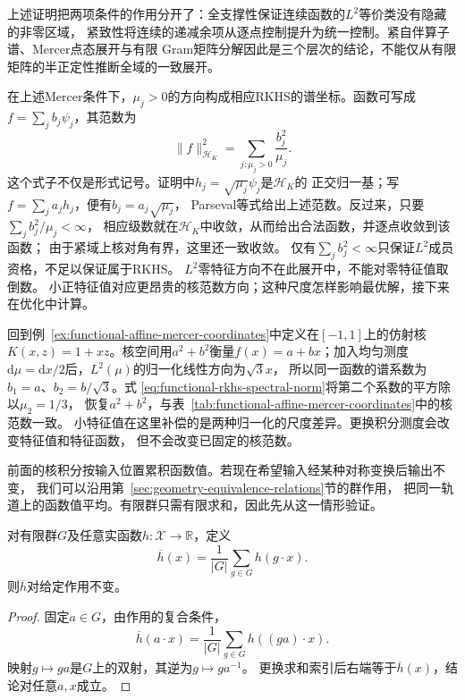 上述证明把两项条件的作用分开了：全支撑性保证连续函数的$L^2$等价类没有隐藏的非零区域，
紧致性将连续的递减余项从逐点控制提升为统一控制。紧自伴算子谱、Mercer点态展开与有限
Gram矩阵分解因此是三个层次的结论，不能仅从有限矩阵的半正定性推断全域的一致展开。

在上述Mercer条件下，$\mu_j>0$的方向构成相应RKHS的谱坐标。函数可写成
$f=\sum_jb_j\psi_j$，其范数为
\begin{equation}
  \lVert f\rVert_{\mathcal{H}_K}^2
  =
  \sum_{j:\mu_j>0}\frac{b_j^2}{\mu_j}.
  \label{eq:functional-rkhs-spectral-norm}
\end{equation}
这个式子不仅是形式记号。证明中$h_j=\sqrt{\mu_j}\psi_j$是$\mathcal H_K$的
正交归一基；写$f=\sum_j a_jh_j$，便有$b_j=a_j\sqrt{\mu_j}$，
Parseval等式给出上述范数。反过来，只要$\sum_j b_j^2/\mu_j<\infty$，
相应级数就在$\mathcal H_K$中收敛，从而给出合法函数，并逐点收敛到该函数；
由于紧域上核对角有界，这里还一致收敛。
仅有$\sum_j b_j^2<\infty$只保证$L^2$成员资格，不足以保证属于RKHS。
$L^2$零特征方向不在此展开中，不能对零特征值取倒数。
小正特征值对应更昂贵的核范数方向；这种尺度怎样影响最优解，接下来在优化中计算。

回到例~\ref{ex:functional-affine-mercer-coordinates}中定义在$[-1,1]$上的仿射核
$K(x,z)=1+xz$。核空间用$a^2+b^2$衡量$f(x)=a+bx$；加入均匀测度
$\mathrm d\mu=\mathrm dx/2$后，$L^2(\mu)$的归一化线性方向为$\sqrt3x$，
所以同一函数的谱系数为$b_1=a$、$b_2=b/\sqrt3$。式
\eqref{eq:functional-rkhs-spectral-norm}将第二个系数的平方除以$\mu_2=1/3$，
恢复$a^2+b^2$，与表~\ref{tab:functional-affine-mercer-coordinates}中的核范数一致。
小特征值在这里补偿的是两种归一化的尺度差异。更换积分测度会改变特征值和特征函数，
但不会改变已固定的核范数。


前面的核积分按输入位置累积函数值。若现在希望输入经某种对称变换后输出不变，
我们可以沿用第~\ref{sec:geometry-equivalence-relations}节的群作用，
把同一轨道上的函数值平均。有限群只需有限求和，因此先从这一情形验证。
\begin{theorem}[有限群平均的不变性]
\label{thm:geometry-finite-group-average}
对有限群$G$及任意实函数$h:\mathcal X\to\mathbb R$，定义
\begin{equation}
 \overline h(x)=\frac1{|G|}\sum_{g\in G}h(g\cdot x).
 \label{eq:geometry-finite-group-averaging}
\end{equation}
则$\overline h$对给定作用不变。
\end{theorem}
\begin{proof}
固定$a\in G$，由作用的复合条件，
\[
 \overline h(a\cdot x)=\frac1{|G|}\sum_{g\in G}h((ga)\cdot x).
\]
映射$g\mapsto ga$是$G$上的双射，其逆为$g\mapsto ga^{-1}$。
更换求和索引后右端等于$\overline h(x)$，结论对任意$a,x$成立。
\end{proof}

